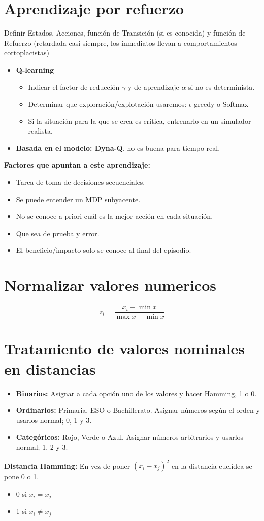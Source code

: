 \documentclass[12pt, twoside, openright]{report} %
\begin{document}
\section{Aprendizaje por refuerzo}
Definir Estados, Acciones, función de Transición (si es conocida) y función de Refuerzo (retardada casi siempre, los inmediatos llevan a comportamientos cortoplacistas)

\begin{itemize}
	\item \textbf{Q-learning}
	      \begin{itemize}
		      \item Indicar el factor de reducción $\gamma$ y de aprendizaje $\alpha$ si no es determinista.
		      \item Determinar que exploración/explotación usaremos: $\epsilon$-greedy o Softmax
		      \item Si la situación para la que se crea es crítica, entrenarlo en un simulador realista.
	      \end{itemize}
	\item \textbf{Basada en el modelo: Dyna-Q}, no es buena para tiempo real.
\end{itemize}

\textbf{Factores que apuntan a este aprendizaje:}
\begin{itemize}
	\item Tarea de toma de decisiones secuenciales.
	\item Se puede entender un MDP subyacente.
	\item No se conoce a priori cuál es la mejor acción en cada situación.
	\item Que sea de prueba y error.
	\item El beneficio/impacto solo se conoce al final del episodio.
\end{itemize}

\section{Normalizar valores numericos}
$$z_i = \frac{x_i - \min x}{\max x - \min x}$$

\section{Tratamiento de valores nominales en distancias}
\begin{itemize}
	\item \textbf{Binarios:} Asignar a cada opción uno de los valores y hacer Hamming, 1 o 0.
	\item \textbf{Ordinarios:} Primaria, ESO o Bachillerato. Asignar números según el orden y usarlos normal; 0, 1 y 3.
	\item \textbf{Categóricos:} Rojo, Verde o Azul. Asignar números arbitrarios y usarlos normal; 1, 2 y 3.
\end{itemize}
\textbf{Distancia Hamming:} En vez de poner $(x_i - x_j)^2$ en la distancia euclídea se pone 0 o 1.
\begin{itemize}
	\item 0 si $x_i = x_j$
	\item 1 si $x_i \neq x_j$
\end{itemize}
\end{document}
